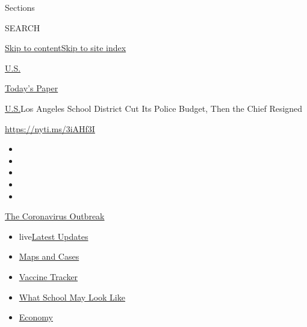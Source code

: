 Sections

SEARCH

\protect\hyperlink{site-content}{Skip to
content}\protect\hyperlink{site-index}{Skip to site index}

\href{https://www.nytimes.com/section/us}{U.S.}

\href{https://myaccount.nytimes.com/auth/login?response_type=cookie\&client_id=vi}{}

\href{https://www.nytimes.com/section/todayspaper}{Today's Paper}

\href{/section/us}{U.S.}\textbar{}Los Angeles School District Cut Its
Police Budget, Then the Chief Resigned

\url{https://nyti.ms/3iAHf3I}

\begin{itemize}
\item
\item
\item
\item
\item
\end{itemize}

\href{https://www.nytimes.com/news-event/coronavirus?action=click\&pgtype=Article\&state=default\&region=TOP_BANNER\&context=storylines_menu}{The
Coronavirus Outbreak}

\begin{itemize}
\tightlist
\item
  live\href{https://www.nytimes.com/2020/08/01/world/coronavirus-covid-19.html?action=click\&pgtype=Article\&state=default\&region=TOP_BANNER\&context=storylines_menu}{Latest
  Updates}
\item
  \href{https://www.nytimes.com/interactive/2020/us/coronavirus-us-cases.html?action=click\&pgtype=Article\&state=default\&region=TOP_BANNER\&context=storylines_menu}{Maps
  and Cases}
\item
  \href{https://www.nytimes.com/interactive/2020/science/coronavirus-vaccine-tracker.html?action=click\&pgtype=Article\&state=default\&region=TOP_BANNER\&context=storylines_menu}{Vaccine
  Tracker}
\item
  \href{https://www.nytimes.com/interactive/2020/07/29/us/schools-reopening-coronavirus.html?action=click\&pgtype=Article\&state=default\&region=TOP_BANNER\&context=storylines_menu}{What
  School May Look Like}
\item
  \href{https://www.nytimes.com/live/2020/07/31/business/stock-market-today-coronavirus?action=click\&pgtype=Article\&state=default\&region=TOP_BANNER\&context=storylines_menu}{Economy}
\end{itemize}

